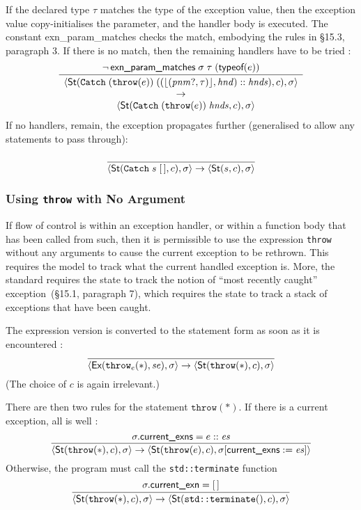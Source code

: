 \documentclass[11pt]{article}
\begin{document}
If the declared type $\tau$ matches the type of the exception value,
then the exception value copy-initialises the parameter, and the
handler body is executed.  The constant \textsf{exn\_param\_matches}
checks the match, embodying the rules in \S15.3, paragraph 3.  If
there is no match, then the remaining handlers have to be tried
:
\[
\infer{
  \begin{array}{c}
    \statebrack{
      \textsf{St}(\texttt{Catch}\;
                    (\texttt{throw}(e))\;
                    ((\lfloor(\mathit{pnm?},\tau)\rfloor, \mathit{hnd})::
                     \mathit{hnds}), c),
      \sigma
    }\\
    \to\\
    \quad\statebrack{
      \textsf{St}(\texttt{Catch}\;(\texttt{throw}(e))\;\mathit{hnds},c),
      \sigma
    }
  \end{array}
}{
  \lnot\,\textsf{exn\_param\_matches}\;\sigma\;\tau\;(\textsf{typeof}(e))
}
\]
If no handlers, remain, the exception propagates further
 (generalised to allow any statements to
pass through):
\[
\infer{
  \statebrack{
    \textsf{St}(\texttt{Catch}\;s\;[\,], c),
    \sigma
  }
  \to
  \statebrack{\textsf{St}(s, c), \sigma}
}{\rule{0mm}{2ex}}
\]


\subsubsection{Using \texttt{throw} with No Argument}
\label{sec:throw-none}

If flow of control is within an exception handler, or within a
function body that has been called from such, then it is permissible
to use the expression \texttt{throw} without any arguments to cause
the current exception to be rethrown.  This requires the model to
track what the current handled exception is.  More, the
standard requires the state to track the notion of ``most recently
caught'' exception~(\S15.1, paragraph 7), which requires the state to
track a stack of exceptions that have been caught.

The expression version \ethrow{} is converted to the statement form as
soon as it is encountered :
\[
\infer{\statebrack{\textsf{Ex}(\ethrow(*),\mathit{se}), \sigma}
  \to
  \statebrack{\textsf{St}(\texttt{throw}(*),c), \sigma}
}{}
\] (The choice of $c$ is again irrelevant.)

There are then two rules for the statement $\texttt{throw}(*)$.  If
there is a current exception, all is well
:
\[
\infer{
  \statebrack{\textsf{St}(\texttt{throw}(*), c), \sigma}
  \to
  \statebrack{\textsf{St}(\texttt{throw}(e), c),
    \sigma[\textsf{current\_exns} := \mathit{es}]}
}{
  \sigma.\textsf{current\_exns} = e :: \mathit{es}
}
\]
Otherwise, the program must call the \texttt{std::terminate} function
\[
\infer{
  \statebrack{\textsf{St}(\texttt{throw}(*), c), \sigma}
  \to
  \statebrack{\textsf{St}(\texttt{std::terminate}(), c),\sigma}
}{
  \sigma.\textsf{current\_exn} = [\,]
}
\]
\end{document}

